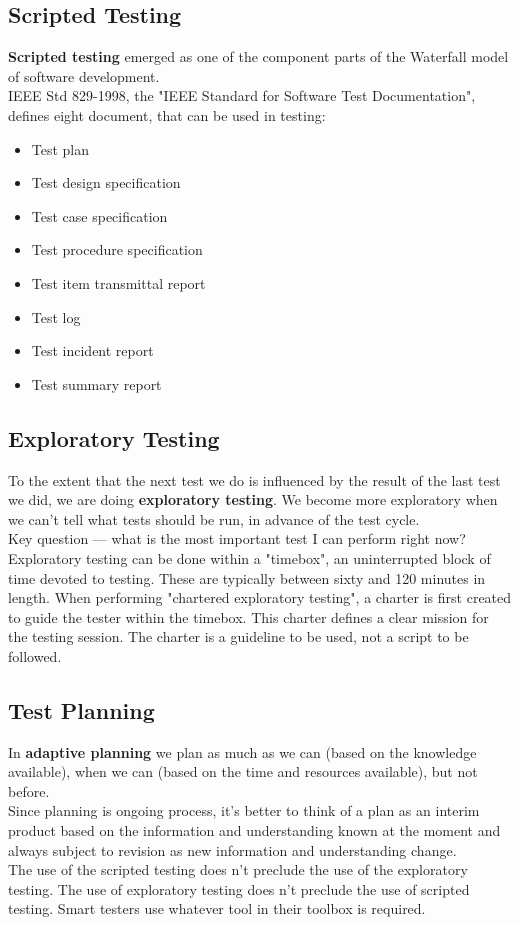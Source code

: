 \documentclass{article}
\begin{document}
\subsection*{Scripted Testing}
\textbf{Scripted testing} emerged as one of the component parts of the Waterfall model of software development.
\\
IEEE Std 829-1998, the "IEEE Standard for Software Test Documentation", defines eight document, that can be used in testing:
\begin{itemize}
\item Test plan
\item Test design specification
\item Test case specification
\item Test procedure specification
\item Test item transmittal report
\item Test log
\item Test incident report
\item Test summary report
\end{itemize}

\subsection*{Exploratory Testing}
To the extent that the next test we do is influenced by the result of the last test we did, we are doing \textbf{exploratory testing}. We become more exploratory when we can't tell what tests should be run, in advance of the test cycle.
\\
Key question --- what is the most important test I can perform right now?
\\
Exploratory testing can be done within a "timebox", an uninterrupted block of time devoted to testing. These are typically between sixty and 120 minutes in length. When performing "chartered exploratory testing", a charter is first created to guide the tester within the timebox. This charter defines a clear mission for the testing session. The charter is a guideline to be used, not a script to be followed.

\subsection*{Test Planning}
In \textbf{adaptive planning} we plan as much as we can (based on the knowledge available), when we can (based on the time and resources available), but not before.
\\
Since planning is ongoing process, it's better to think of a plan as an interim product based on the information and understanding known at the moment and always subject to revision as new information and understanding change.
\\
The use of the scripted testing does n't preclude the use of the exploratory testing. The use of exploratory testing does n't preclude the use of scripted testing. Smart testers use whatever tool in their toolbox is required.
\end{document}
